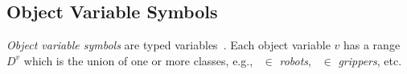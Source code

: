 \subsection{Object Variable Symbols}\label{object_variable_symbol}
\textit{Object variable symbols} are typed variables~\cite{NAU.2004}. Each object variable $v$ has a range $D^v$ which is the union of one or more classes, e.g., \robot\ $\in$ \textit{robots}, \grip\ $\in$ \textit{grippers}, etc. 